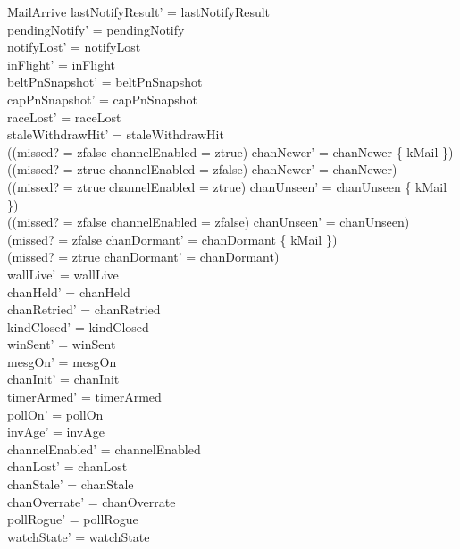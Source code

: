 \documentclass[a4paper,10pt,fleqn]{article}
\begin{document}
\begin{schema}{MailArrive}
  lastNotifyResult' = lastNotifyResult \\
  pendingNotify' = pendingNotify \\
  notifyLost' = notifyLost \\
  inFlight' = inFlight \\
  beltPnSnapshot' = beltPnSnapshot \\
  capPnSnapshot' = capPnSnapshot \\
  raceLost' = raceLost \\
  staleWithdrawHit' = staleWithdrawHit \\
  ((missed? = zfalse \land channelEnabled = ztrue) \implies
  chanNewer' = chanNewer \cup \{ kMail \}) \\
  ((missed? = ztrue \lor channelEnabled = zfalse) \implies
  chanNewer' = chanNewer) \\
  ((missed? = ztrue \land channelEnabled = ztrue) \implies
  chanUnseen' = chanUnseen \cup \{ kMail \}) \\
  ((missed? = zfalse \lor channelEnabled = zfalse) \implies
  chanUnseen' = chanUnseen) \\
  (missed? = zfalse \implies
  chanDormant' = chanDormant \setminus \{ kMail \}) \\
  (missed? = ztrue \implies chanDormant' = chanDormant) \\
  wallLive' = wallLive \\
  chanHeld' = chanHeld \\
  chanRetried' = chanRetried \\
  kindClosed' = kindClosed \\
  winSent' = winSent \\
  mesgOn' = mesgOn \\
  chanInit' = chanInit \\
  timerArmed' = timerArmed \\
  pollOn' = pollOn \\
  invAge' = invAge \\
  channelEnabled' = channelEnabled \\
  chanLost' = chanLost \\
  chanStale' = chanStale \\
  chanOverrate' = chanOverrate \\
  pollRogue' = pollRogue \\
  watchState' = watchState
\end{schema}
\end{document}
